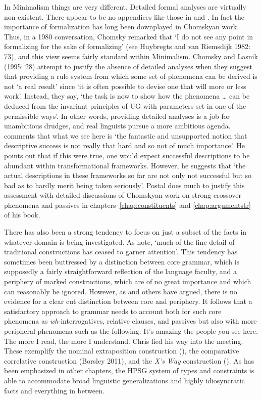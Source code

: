 \documentclass[output=paper]{langsci/langscibook}
\begin{document}
In Minimalism things are very different. Detailed formal analyses are virtually non-existent. There appear to be no appendices like those in \citet{Sag97a} and \citet{GSag2000a-u}. In fact the importance of formalization has long been downplayed in Chomskyan work. Thus, in a 1980 conversation, Chomsky remarked that `I do not see any point in formalizing for the sake of formalizing' (see Huybregts and van Riemsdijk 1982: 73), and this view seems fairly standard within Minimalism. Chomsky and Lasnik (1995: 28) attempt to justify the absence of detailed analyses when they suggest that providing a rule system from which some set of phenomena can be derived is not `a real result' since `it is often possible to devise one that will more or less work'. Instead, they say, `the task is now to show how the phenomena \ldots{} can be deduced from the invariant principles of UG with parameters set in one of the permissible ways'. In other words, providing detailed analyses is a job for unambitious drudges, and real linguists pursue a more ambitious agenda. \citet[5]{Postal2004a-u} comments that what we see here is `the fantastic and unsupported notion that descriptive success is not really that hard and so not of much importance'. He points out that if this were true, one would expect successful descriptions to be abundant within transformational frameworks. However, he suggests that `the actual descriptions in these frameworks so far are not only not successful but so bad as to hardly merit being taken seriously'. Postal does much to justify this assessment with detailed discussions of Chomskyan work on strong crossover phenomena and passives in chapters~\ref{chap:constituents} and \ref{chap:argumentstr} of his book.

There has also been a strong tendency to focus on just a subset of the facts in whatever domain is being investigated. As \citet[535]{CJ2005a} note, `much of the fine detail of traditional constructions has ceased to garner attention'. This tendency has sometimes been buttressed by a distinction between core grammar, which is supposedly a fairly straightforward reflection of the language faculty, and a periphery of marked constructions, which are of no great importance and which can reasonably be ignored. However, as \citet{Culicover99a-u} and others have argued, there is no evidence for a clear cut distinction between core and periphery. It follows that a satisfactory approach to grammar needs to account both for such core phenomena as \textit{wh}-interrogatives, relative clauses, and passives but also with more peripheral phenomena such as the following:
\eal
\ex It's amazing the people you see here.\label{ex:min-amazing-people}
\ex The more I read, the more I understand.\label{ex:min-read-understand}
\ex Chris lied his way into the meeting.\label{ex:min-chris-meeting}
\zl 
These exemplify the nominal extraposition construction (\citealt{ML96a}), the comparative correlative construction (Borsley 2011), and the \textit{X's Way} construction (\citealt{Sag2012a}). As has been emphasized in other chapters, the HPSG system of types and constraints is able to accommodate broad linguistic generalizations and highly idiosyncratic facts and everything in between.
\end{document}

